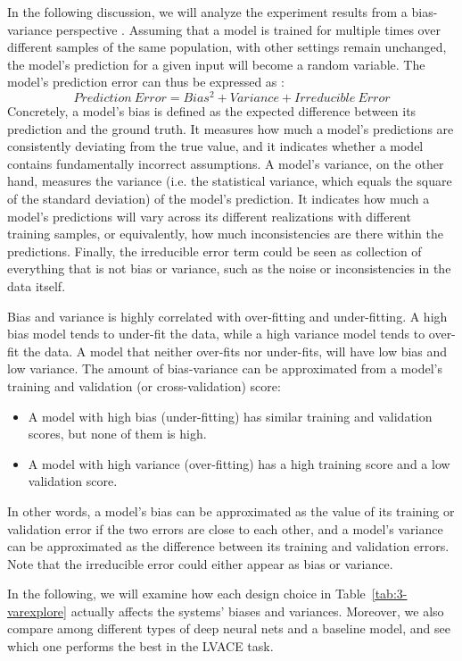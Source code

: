 In the following discussion, we will analyze the experiment results from a bias-variance perspective \cite{geman1992neural}. Assuming that a model is trained for multiple times over different samples of the same population, with other settings remain unchanged, the model's prediction for a given input will become a random variable. The model's prediction error can thus be expressed as \cite{friedman2001elements}:
\begin{equation}
Prediction\ Error = Bias^2 + Variance + Irreducible\ Error
\end{equation}
Concretely, a model's bias is defined as the expected difference between its prediction and the ground truth. It measures how much a model's predictions are consistently deviating from the true value, and it indicates whether a model contains fundamentally incorrect assumptions. A model's variance, on the other hand, measures the variance (i.e. the statistical variance, which equals the square of the standard deviation) of the model's prediction. It indicates how much a model's predictions will vary across its different realizations with different training samples, or equivalently, how much inconsistencies are there within the predictions. Finally, the irreducible error term could be seen as collection of everything that is not bias or variance, such as the noise or inconsistencies in the data itself.

Bias and variance is highly correlated with over-fitting and under-fitting. A high bias model tends to under-fit the data, while a high variance model tends to over-fit the data. A model that neither over-fits nor under-fits, will have low bias and low variance. The amount of bias-variance can be approximated from a model's training and validation (or cross-validation) score:
\begin{itemize}
	\item A model with high bias (under-fitting) has similar training and validation scores, but none of them is high.
	\item A model with high variance (over-fitting) has a high training score and a low validation score.
\end{itemize}
In other words, a model's bias can be approximated as the value of its training or validation error if the two errors are close to each other, and a model's variance can be approximated as the difference between its training and validation errors. Note that the irreducible error could either appear as bias or variance.

In the following, we will examine how each design choice in Table~\ref{tab:3-varexplore} actually affects the systems' biases and variances. Moreover, we also compare among different types of deep neural nets and a baseline model, and see which one performs the best in the LVACE task.

